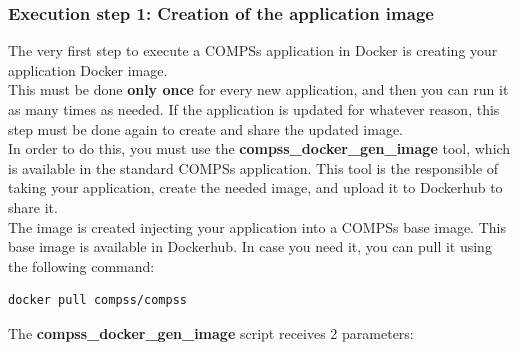 \subsubsection{Execution step 1: Creation of the application image}
The very first step to execute a COMPSs application in Docker is creating your application Docker image. \\
This must be done \textbf{only once} for every new application, and then you can run it as many times as needed. 
If the application is updated for whatever reason, this step must be done again to create and share 
the updated image. \\
In order to do this, you must use the \textbf{compss\_docker\_gen\_image} tool, which is available in the standard COMPSs application.
This tool is the responsible of taking your application, create the needed image, and upload it to Dockerhub to share it. \\
The image is created injecting your application into a COMPSs base image. This base image is available in Dockerhub. 
In case you need it, you can pull it using the following command:
\begin{lstlisting}[language=bash]
docker pull compss/compss
\end{lstlisting}
The \textbf{compss\_docker\_gen\_image} script receives 2 parameters:
